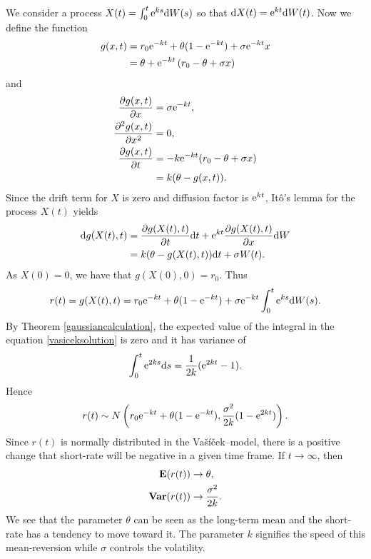 We consider a process $X(t) = \int_0^t \mathrm{e}^{k s} \mathrm{d} W(s)$ so that $\mathrm{d} X(t) = \mathrm{e}^{k t} \mathrm{d} W(t)$. Now we define the function
\begin{align}
g(x,t) &= r_0 \mathrm{e}^{-k t} + \theta (1 - \mathrm{e}^{-k t}) + \sigma \mathrm{e}^{-k t} x \\
	&= \theta + \mathrm{e}^{-k t} \left( r_0 - \theta + \sigma x \right) 
\end{align}
and
\begin{align}
\frac{ \partial g(x,t)}{ \partial x} &= \sigma \mathrm{e}^{-k t}, \\
\frac{ \partial^2 g(x,t)}{ \partial x^2} &= 0, \\
\frac{ \partial g(x,t)}{ \partial t} &= - k \mathrm{e}^{- k t} (r_0 - \theta +\sigma x ) \\
&= k (\theta -g(x,t) ). 
\end{align}
Since the drift term for $X$ is zero and diffusion factor is $\mathrm{e}^{k t}$, It\^{o}'s lemma for the process $X(t)$ yields
\begin{align}
\mathrm{d} g (X(t),t) &= \frac{ \partial g(X(t),t) }{ \partial t} \mathrm{d} t + \mathrm{e}^{k t} \frac{ \partial g(X(t),t)}{ \partial x} \mathrm{d} W \\
&= k (\theta -g(X(t),t) ) \mathrm{d} t + \sigma W(t) .
\end{align}
As $X(0)=0$, we have that $g(X(0),0) = r_0$. Thus
\begin{align}
\label{vasiceksolution}
r(t) = g(X(t),t) = r_0 \mathrm{e}^{-k t} + \theta (1 - \mathrm{e}^{-k t}) + \sigma \mathrm{e}^{-k t} \int_0^t \mathrm{e}^{k s} \mathrm{d} W(s) .
\end{align}
By Theorem \ref{gaussiancalculation}, the expected value of the integral in the equation \ref{vasiceksolution} is zero and it has variance of
\begin{align}
\int_0^t \mathrm{e}^{2 k s} \mathrm{d} s = \frac{1}{2 k} (\mathrm{e}^{2 k t} -1).
\end{align}
Hence
\begin{align}
r(t) \sim N \left( r_0 \mathrm{e}^{-k t} + \theta (1 - \mathrm{e}^{-k t}), \frac{\sigma^2}{2k } (1-\mathrm{e}^{2k t}) \right) .
\end{align}
Since $r(t)$ is normally distributed in the Va\v{s}\'{i}\v{c}ek--model, there is a positive change that short-rate will be negative in a given time frame. If $t \rightarrow \infty$, then 
\begin{align}
\operatorname{\boldsymbol{\mathrm{E}}} (r(t)) &\rightarrow \theta , \\
\operatorname{\boldsymbol{\mathrm{Var}}} ( r(t) ) &\rightarrow \frac{\sigma^2}{2k} .
\end{align}
We see that the parameter $\theta$ can be seen as the long-term mean and the short-rate has a tendency to move toward it. The parameter $k$ signifies the speed of this mean-reversion while $\sigma$ controls the volatility.

